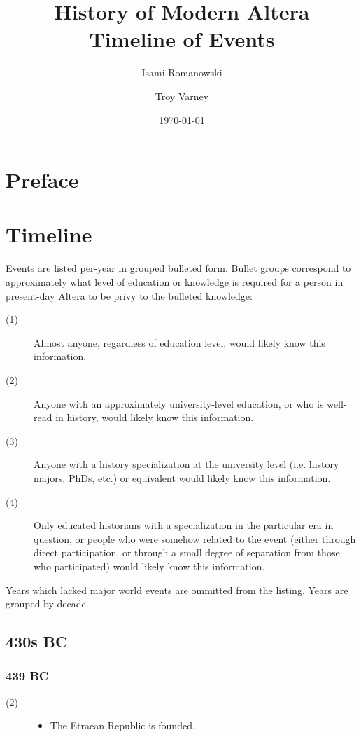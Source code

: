\documentclass[a4paper, 11pt]{article}
\def\level#1{\item[(#1)\hspace{9.5pt}]}
\newenvironment{knowlevels}{\begin{description}}{\end{description}} %
\def\decadeblk#1{\subsection{#1}}
\def\yearblk#1{\subsubsection{#1}}
\begin{document}
\title{History of Modern Altera \\ \large{Timeline of Events}}
\date{\today}
\author{Isami Romanowski \and Troy Varney}
\maketitle

\tableofcontents

\section{Preface}

\section{Timeline}
Events are listed per-year in grouped bulleted form.  Bullet groups correspond to approximately what level of education or knowledge is required for a person in present-day Altera to be privy to the bulleted knowledge:
\begin{knowlevels}
\level{1}  Almost anyone, regardless of education level, would likely know this information.

\level{2}  Anyone with an approximately university-level education, or who is well-read in history, would likely know this information.

\level{3}  Anyone with a history specialization at the university level (i.e. history majors, PhDs, etc.) or equivalent would likely know this information.

\level{4}  Only educated historians with a specialization in the particular era in question, or people who were somehow related to the event (either through direct participation, or through a small degree of separation from those who participated) would likely know this information.
\end{knowlevels}
Years which lacked major world events are ommitted from the listing.  Years are grouped by decade.

\decadeblk{430s BC}
\yearblk{439 BC}
\begin{knowlevels}
\level{2} {
  \begin{itemize}
  \item The Etraean Republic is founded.
  \end{itemize}
}
\end{knowlevels}
\end{document}
